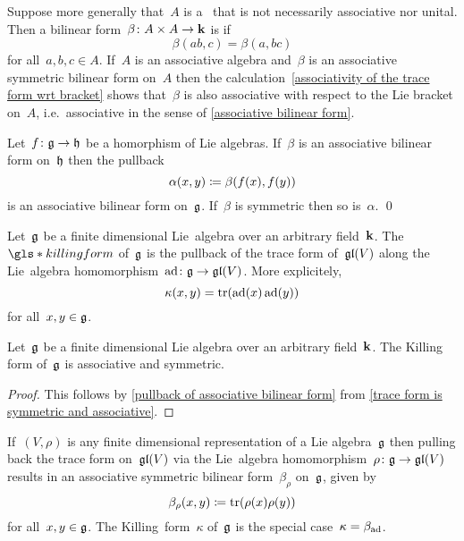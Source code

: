 \begin{remark}
  Suppose more generally that~$A$ is a~{\algebra{$\kf$}} that is not necessarily associative nor unital.
  Then a bilinear form~$\beta \colon A \times A \to \mathbf{k}$ is  if
  \[
    \beta(ab, c)
    =
    \beta(a, bc)
  \]
  for all~$a, b , c \in A$.
  If~$A$ is an associative algebra and~$\beta$ is an associative symmetric bilinear form on~$A$ then the calculation~\eqref{associativity of the trace form wrt bracket} shows that~$\beta$ is also associative with respect to the Lie bracket on~$A$, i.e.\ associative in the sense of \cref{associative bilinear form}.
\end{remark}


\begin{lemma}
  \label{pullback of associative bilinear form}
  Let~$f \colon \mathfrak{g} \to \mathfrak{h}$ be a homorphism of Lie algebras.
  If~$\beta$ is an associative bilinear form on~$\mathfrak{h}$ then the pullback
  \[
    \alpha(x,y)
    \coloneqq
    \beta(f(x), f(y))
  \]
  is an associative bilinear form on~$\mathfrak{g}$.
  If~$\beta$ is symmetric then so is~$\alpha$.
  \qed
\end{lemma}


\begin{definition}
  \label{killing form}
  Let~$\mathfrak{g}$ be a finite dimensional Lie~algebra over an arbitrary field~$\kf$.
  The ~$\gls*{killing form}$ of~$\mathfrak{g}$ is the pullback of the trace form of~$\mathfrak{gl}(V)$ along the Lie~algebra homomorphism~$\operatorname{ad} \colon \mathfrak{g} \to \mathfrak{gl}(V)$.
  More explicitely,
  \[
    \kappa(x,y)
    =
    \operatorname{tr}(\operatorname{ad}(x) \operatorname{ad}(y))
  \]
  for all~$x, y \in \mathfrak{g}$.
\end{definition}


\begin{lemma}
  \label{killing form is associative and symmetric}
  Let~$\mathfrak{g}$ be a finite dimensional Lie algebra over an arbitrary field~$\kf$.
  The Killing form of~$\mathfrak{g}$ is associative and symmetric.
\end{lemma}


\begin{proof}
  This follows by \cref{pullback of associative bilinear form} from \cref{trace form is symmetric and associative}.
\end{proof}


\begin{remark}
  \label{associative bilinear form of a representation}
  If~$(V,\rho)$ is any finite dimensional representation of a Lie algebra~$\mathfrak{g}$ then pulling back the trace form on~$\mathfrak{gl}(V)$ via the Lie~algebra homomorphism~$\rho \colon \mathfrak{g} \to \mathfrak{gl}(V)$ results in an associative symmetric bilinear form~$\beta_\rho$ on~$\mathfrak{g}$, given by
  \[
    \beta_\rho(x,y)
    \coloneqq
    \operatorname{tr}(\rho(x) \rho(y))
  \]
  for all~$x, y \in \mathfrak{g}$.
  The Killing~form~$\kappa$ of~$\mathfrak{g}$ is the special case~$\kappa = \beta_{\operatorname{ad}}$.
\end{remark}



